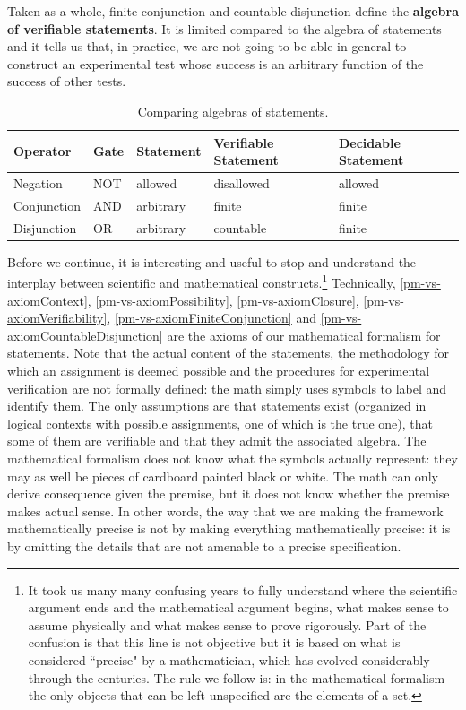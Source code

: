 	Taken as a whole, finite conjunction and countable disjunction define the \textbf{algebra of verifiable statements}. It is limited compared to the algebra of statements and it tells us that, in practice, we are not going to be able in general to construct an experimental test whose success is an arbitrary function of the success of other tests.
	
	\begin{table}[h]
		\centering
		\begin{tabular}{p{} p{} p{} p{} p{}}
			Operator & Gate & Statement & Verifiable Statement & Decidable Statement  \\ 
			\hline 
			Negation & NOT & allowed & disallowed & allowed \\ 
			Conjunction & AND & arbitrary  & finite & finite \\ 
			Disjunction & OR & arbitrary  & countable & finite \\ 
		\end{tabular}
		\caption{Comparing algebras of statements.}
	\end{table}
	
	Before we continue, it is interesting and useful to stop and understand the interplay between scientific and mathematical constructs.\footnote{It took us many many confusing years to fully understand where the scientific argument ends and the mathematical argument begins, what makes sense to assume physically and what makes sense to prove rigorously. Part of the confusion is that this line is not objective but it is based on what is considered ``precise" by a mathematician, which has evolved considerably through the centuries. The rule we follow is: in the mathematical formalism the only objects that can be left unspecified are the elements of a set.} Technically, \ref{pm-vs-axiomContext}, \ref{pm-vs-axiomPossibility}, \ref{pm-vs-axiomClosure}, \ref{pm-vs-axiomVerifiability}, \ref{pm-vs-axiomFiniteConjunction} and \ref{pm-vs-axiomCountableDisjunction} are the axioms of our mathematical formalism for statements. Note that the actual content of the statements, the methodology for which an assignment is deemed possible and the procedures for experimental verification are not formally defined: the math simply uses symbols to label and identify them. The only assumptions are that statements exist (organized in logical contexts with possible assignments, one of which is the true one), that some of them are verifiable and that they admit the associated algebra. The mathematical formalism does not know what the symbols actually represent: they may as well be pieces of cardboard painted black or white. The math can only derive consequence given the premise, but it does not know whether the premise makes actual sense. In other words, the way that we are making the framework mathematically precise is not by making everything mathematically precise: it is by omitting the details that are not amenable to a precise specification.
	
